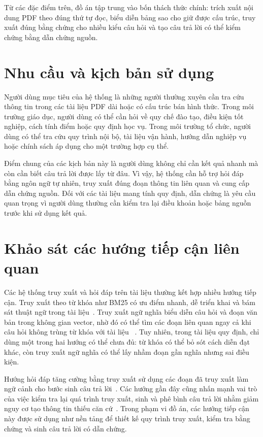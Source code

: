 \documentclass[../DoAn.tex]{subfiles}
\begin{document}
Từ các đặc điểm trên, đồ án tập trung vào bốn thách thức chính: trích xuất nội dung
PDF theo đúng thứ tự đọc, biểu diễn bảng sao cho giữ được cấu trúc, truy xuất đúng
bằng chứng cho nhiều kiểu câu hỏi và tạo câu trả lời có thể kiểm chứng bằng dẫn
chứng nguồn.

\section{Nhu cầu và kịch bản sử dụng}
\label{section:user-needs}

Người dùng mục tiêu của hệ thống là những người thường xuyên cần tra cứu thông
tin trong các tài liệu PDF dài hoặc có cấu trúc bán hình thức. Trong môi trường giáo
dục, người dùng có thể cần hỏi về quy chế đào tạo, điều kiện tốt nghiệp, cách tính
điểm hoặc quy định học vụ. Trong môi trường tổ chức, người dùng có thể tra cứu
quy trình nội bộ, tài liệu vận hành, hướng dẫn nghiệp vụ hoặc chính sách áp dụng
cho một trường hợp cụ thể.

Điểm chung của các kịch bản này là người dùng không chỉ cần kết quả nhanh mà
còn cần biết câu trả lời được lấy từ đâu. Vì vậy, hệ thống cần hỗ trợ hỏi đáp bằng
ngôn ngữ tự nhiên, truy xuất đúng đoạn thông tin liên quan và cung cấp dẫn chứng
nguồn. Đối với các tài liệu mang tính quy định, dẫn chứng là yêu cầu quan trọng vì
người dùng thường cần kiểm tra lại điều khoản hoặc bảng nguồn trước khi sử dụng
kết quả.

\section{Khảo sát các hướng tiếp cận liên quan}
\label{section:related-approaches}

Các hệ thống truy xuất và hỏi đáp trên tài liệu thường kết hợp nhiều hướng tiếp
cận. Truy xuất theo từ khóa như BM25 có ưu điểm nhanh, dễ triển khai và bám sát
thuật ngữ trong tài liệu~\cite{robertson2009bm25}. Truy xuất ngữ nghĩa biểu diễn
câu hỏi và đoạn văn bản trong không gian vector, nhờ đó có thể tìm các đoạn liên
quan ngay cả khi câu hỏi không trùng từ khóa với tài liệu~
\cite{karpukhin2020dpr,reimers2019sentencebert}. Tuy nhiên, trong tài liệu quy
định, chỉ dùng một trong hai hướng có thể chưa đủ: từ khóa có thể bỏ sót cách diễn
đạt khác, còn truy xuất ngữ nghĩa có thể lấy nhầm đoạn gần nghĩa nhưng sai điều
kiện.

Hướng hỏi đáp tăng cường bằng truy xuất sử dụng các đoạn đã truy xuất làm ngữ
cảnh cho bước sinh câu trả lời~\cite{lewis2020rag}. Các hướng gần đây cũng nhấn
mạnh vai trò của việc kiểm tra lại quá trình truy xuất, sinh và phê bình câu trả lời
nhằm giảm nguy cơ tạo thông tin thiếu căn cứ~\cite{asai2024selfrag}. Trong phạm
vi đồ án, các hướng tiếp cận này được sử dụng như nền tảng để thiết kế quy trình
truy xuất, kiểm tra bằng chứng và sinh câu trả lời có dẫn chứng.
\end{document}
